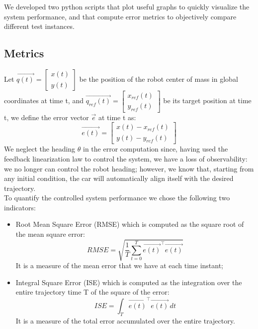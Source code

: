 We developed two python scripts that plot useful graphs to quickly visualize the system performance, and 
that compute error metrics to objectively compare different test instances. 
\subsection{Metrics}
Let $\vec{q(t)}=\begin{bmatrix} x(t) \\ y(t) \end{bmatrix}$ be the position of the robot center of mass in global coordinates at 
time t, and $\vec{q_{ref}(t)}=\begin{bmatrix} x_{ref}(t) \\ y_{ref}(t) \end{bmatrix}$ be its target position at time t, we define
the error vector $\vec{e}$ at time t as:
\[
    \vec{e(t)} = \begin{bmatrix} x(t) - x_{ref}(t) \\ y(t) - y_{ref}(t) \end{bmatrix}
\] 
We neglect the heading $\theta$ in the error computation since, having used the feedback linearization law to control
the system, we have a loss of observability: we no longer can control the robot heading; however, we know that, starting
from any initial condition, the car will automatically align itself with the desired trajectory. \\
To quantify the controlled system performance we chose the following two indicators:
\begin{itemize}
    \item Root Mean Square Error (RMSE) which is computed as the square root of the mean square error:
    \[
        RMSE = \sqrt{\frac{1}{T} \sum_{t=0}^{T}\vec{e(t)}^\intercal\vec{e(t)}}
    \] 
    It is a measure of the mean error that we have at each time instant;
    \item Integral Square Error (ISE) which is computed as the integration over the entire trajectory time T of the square
    of the error:
    \[
        ISE = \int_{T}^{} \vec{e(t)}^\intercal\vec{e(t)}\,dt
    \] 
    It is a measure of the total error accumulated over the entire trajectory.
\end{itemize}

